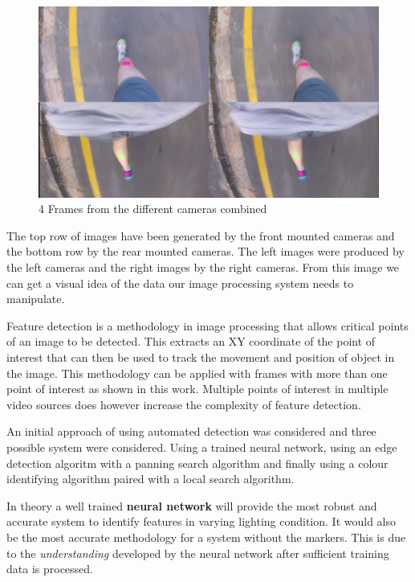 \begin{figure}[!ht]
  \includegraphics[width=\linewidth]{figures/pat_run_quad.png}
  \caption{4 Frames from the different cameras combined}
  \label{fig:pat_run_quad}
\end{figure}

The top row of images have been generated by the front mounted cameras and the bottom row by the rear mounted cameras. The left images were produced by the left cameras and the right images by the right cameras. From this image we can get a visual idea of the data our image processing system needs to manipulate.

Feature detection is a methodology in image processing that allows critical points of an image to be detected. This extracts an XY coordinate of the point of interest that can then be used to track the movement and position of object in the image. This methodology can be applied with frames with more than one point of interest as shown in this work. Multiple points of interest in multiple video sources does however increase the complexity of feature detection.

An initial approach of using automated detection was considered and three possible system were considered. Using a trained neural network, using an edge detection algoritm with a panning search algorithm and finally using a colour identifying algorithm paired with a local search algorithm.

In theory a well trained \textbf{neural network} will provide the most robust and accurate system to identify features in varying lighting condition. It would also be the most accurate methodology for a system without the markers. This is due to the \textit{understanding} developed by the neural network after sufficient training data is processed.


